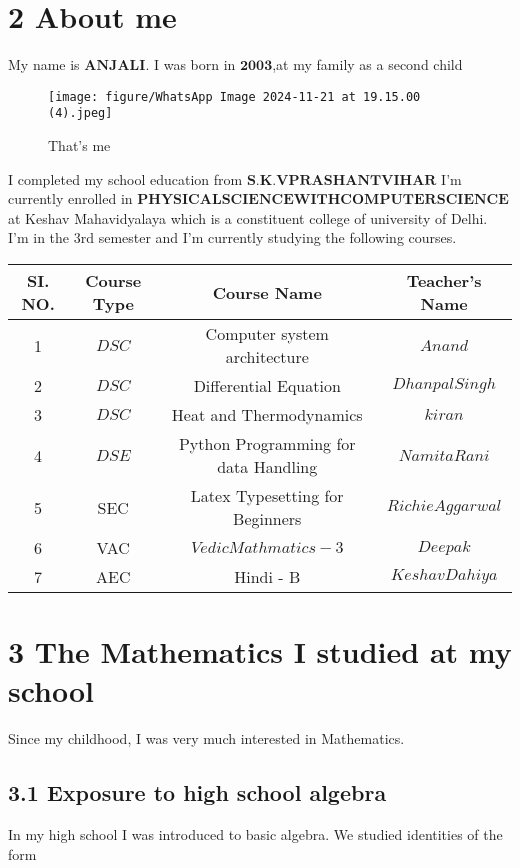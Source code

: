 \documentclass[12pt, a4paper]{article}
\begin{document}
 \section*{2 About me } 
 My name is  $\boldsymbol{ANJALI} $. I was born in 
 $ \boldsymbol{2003}$,at my family as a second child 
\begin{figure}
    \centering
    \texttt{[image: figure/WhatsApp Image 2024-11-21 at 19.15.00 (4).jpeg]}
    \caption{That's me}
    \label{fig:enter-label}
\end{figure}
 I completed my school education from  $\boldsymbol{S.K.V PRASHANT VIHAR} $
 I’m currently enrolled in $\boldsymbol{PHYSICAL SCIENCE WITH COMPUTER SCIENCE} $  at Keshav Mahavidyalaya which is a constituent college of university of Delhi. I’m in the 3rd semester and I’m currently studying the following courses. \\      
\begin{tabular}{|c|c|c|c|}
\hline
     \textbf{SI. NO.} & \textbf{Course Type} & \textbf{Course Name} & \textbf{Teacher's Name} \\
\hline
     1 & $DSC$ & Computer system architecture & $Anand$ \\
\hline
     2 & $DSC$ & Differential Equation & $Dhanpal Singh$ \\
\hline
     3 & $DSC$ & Heat and Thermodynamics & $kiran$  \\
\hline
     4 & $DSE$ & Python Programming for data Handling & $Namita Rani$  \\
\hline
      5 & SEC & Latex Typesetting for Beginners &  $Richie Aggarwal$\\
\hline
     6 & VAC & $Vedic Mathmatics-3$  & $Deepak$  \\
\hline
     7 & AEC & Hindi - B & $Keshav Dahiya$ \\
\hline  
\end{tabular}
\section*{3  The Mathematics I studied at my school}     
     Since my childhood, I was very much interested in Mathematics.
\subsection*{ 3.1  Exposure to high school algebra}         
 In my high school I was introduced to basic algebra. We studied identities of the form
\end{document}
